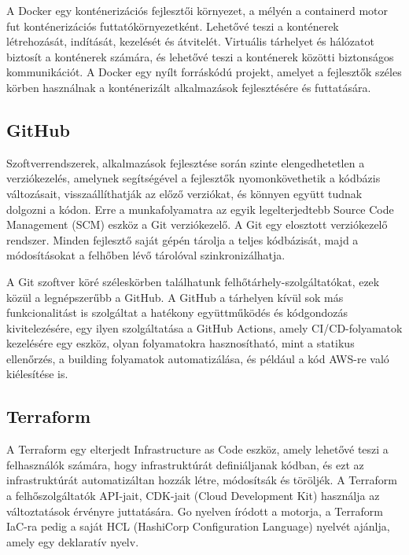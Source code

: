 A Docker egy konténerizációs fejlesztői környezet, a mélyén a containerd motor fut konténerizációs futtatókörnyezetként. \cite{Docker} Lehetővé teszi a konténerek létrehozását, indítását, kezelését és átvitelét. Virtuális tárhelyet és hálózatot biztosít a konténerek számára, és lehetővé teszi a konténerek közötti biztonságos kommunikációt. A Docker egy nyílt forráskódú projekt, amelyet a fejlesztők széles körben használnak a konténerizált alkalmazások fejlesztésére és futtatására.

\subsection{GitHub}

Szoftverrendszerek, alkalmazások fejlesztése során szinte elengedhetetlen a verziókezelés, amelynek segítségével a fejlesztők nyomonkövethetik a kódbázis változásait, visszaállíthatják az előző verziókat, és könnyen együtt tudnak dolgozni a kódon. Erre a munkafolyamatra az egyik legelterjedtebb Source Code Management (SCM) eszköz a Git verziókezelő. A Git egy elosztott verziókezelő rendszer. Minden fejlesztő saját gépén tárolja a teljes kódbázisát, majd a módosításokat a felhőben lévő tárolóval szinkronizálhatja.

A Git szoftver köré széleskörben találhatunk felhőtárhely-szolgáltatókat, ezek közül a legnépszerűbb a GitHub. A GitHub a tárhelyen kívül sok más funkcionalitást is szolgáltat a hatékony együttműködés és kódgondozás kivitelezésére, egy ilyen szolgáltatása a GitHub Actions, amely CI/CD-folyamatok kezelésére egy eszköz, olyan folyamatokra hasznosítható, mint a statikus ellenőrzés, a building folyamatok automatizálása, és például a kód AWS-re való kiélesítése is.

\subsection{Terraform}

A Terraform egy elterjedt Infrastructure as Code eszköz, amely lehetővé teszi a felhasználók számára, hogy infrastruktúrát definiáljanak kódban, és ezt az infrastruktúrát automatizáltan hozzák létre, módosítsák és töröljék. A Terraform a felhőszolgáltatók API-jait, CDK-jait (Cloud Development Kit) használja az változtatások érvényre juttatására. Go nyelven íródott a motorja, a Terraform IaC-ra pedig a saját HCL (HashiCorp Configuration Language) nyelvét ajánlja, amely egy deklaratív nyelv.
